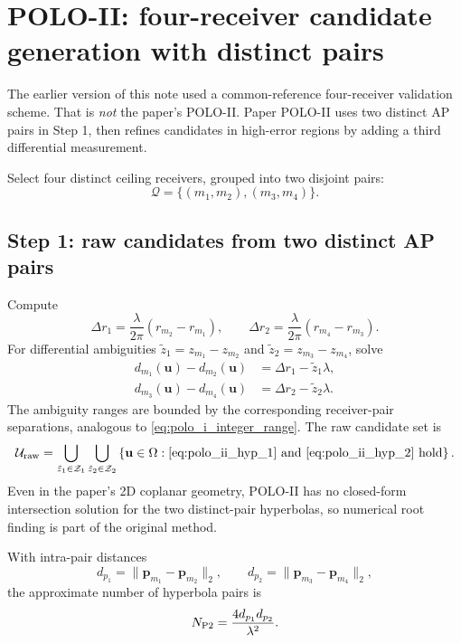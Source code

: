 \documentclass[11pt]{article}
\begin{document}
\section{POLO-II: four-receiver candidate generation with distinct pairs}
\label{sec:polo_ii}

The earlier version of this note used a common-reference four-receiver validation scheme. That is \emph{not} the paper's POLO-II. Paper POLO-II uses two distinct AP pairs in Step 1, then refines candidates in high-error regions by adding a third differential measurement.

Select four distinct ceiling receivers, grouped into two disjoint pairs:
\begin{equation}
    \mathcal{Q}=\{(m_1,m_2),(m_3,m_4)\}.
\end{equation}

\subsection{Step 1: raw candidates from two distinct AP pairs}

Compute
\begin{equation}
    \Delta r_1=\frac{\lambda}{2\pi}(r_{m_2}-r_{m_1}),
    \qquad
    \Delta r_2=\frac{\lambda}{2\pi}(r_{m_4}-r_{m_3}).
    \label{eq:polo_ii_step1_dphase}
\end{equation}
For differential ambiguities $\tilde z_1=z_{m_1}-z_{m_2}$ and $\tilde z_2=z_{m_3}-z_{m_4}$, solve
\begin{align}
    d_{m_1}(\mathbf{u})-d_{m_2}(\mathbf{u})
    &=\Delta r_1-\tilde z_1\lambda,\label{eq:polo_ii_hyp_1}\\
    d_{m_3}(\mathbf{u})-d_{m_4}(\mathbf{u})
    &=\Delta r_2-\tilde z_2\lambda.\label{eq:polo_ii_hyp_2}
\end{align}
The ambiguity ranges are bounded by the corresponding receiver-pair separations, analogous to \eqref{eq:polo_i_integer_range}. The raw candidate set is
\begin{equation}
    \mathcal{U}_{\rm raw}=\bigcup_{\tilde z_1\in\mathcal{Z}_1}
    \bigcup_{\tilde z_2\in\mathcal{Z}_2}
    \left\{\mathbf{u}\in\Omega:
    \eqref{eq:polo_ii_hyp_1}\text{ and }\eqref{eq:polo_ii_hyp_2}\text{ hold}
    \right\}.
\end{equation}
Even in the paper's 2D coplanar geometry, POLO-II has no closed-form intersection solution for the two distinct-pair hyperbolas, so numerical root finding is part of the original method.

With intra-pair distances
\begin{equation}
    d_{p_1}=\|\mathbf{p}_{m_1}-\mathbf{p}_{m_2}\|_2,
    \qquad
    d_{p_2}=\|\mathbf{p}_{m_3}-\mathbf{p}_{m_4}\|_2,
\end{equation}
the approximate number of hyperbola pairs is
\begin{equation}
    N_{\rm P2}=\frac{4d_{p_1}d_{p_2}}{\lambda^2}.
\end{equation}
\end{document}
